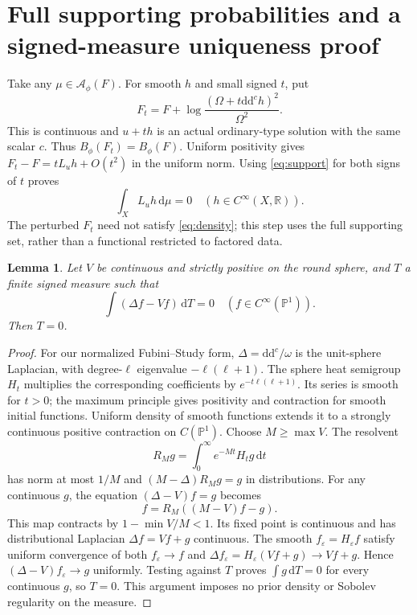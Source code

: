 \documentclass[11pt]{article}
\newtheorem{lemma}[theorem]{Lemma}
\newcommand{\ddc}{\mathrm{d}\mathrm{d}^c}
\newcommand{\suppset}{\mathcal A}
\begin{document}
\section{Full supporting probabilities and a signed-measure uniqueness proof}

Take any $\mu\in\suppset_\phi(F)$. For smooth $h$ and small signed $t$,
put
\[
 F_t=F+\log\frac{(\Omega+t\ddc h)^2}{\Omega^2}.
\]
This is continuous and $u+t h$ is an actual ordinary-type solution with
the same scalar $c$. Thus $B_\phi(F_t)=B_\phi(F)$. Uniform positivity gives
$F_t-F=tL_uh+O(t^2)$ in the uniform norm. Using \eqref{eq:support}
for both signs of $t$ proves
\begin{equation}\label{eq:annihilate}
 \int_XL_uh\,\mathrm{d}\mu=0\quad(h\in C^\infty(X,\mathbb R)).
\end{equation}
The perturbed $F_t$ need not satisfy \eqref{eq:density}; this step uses
the full supporting set, rather than a functional restricted to factored data.

\begin{lemma}\label{lem:resolvent}
Let $V$ be continuous and strictly positive on the round sphere, and $T$
a finite signed measure such that
\[
 \int(\Delta f-Vf)\,\mathrm{d}T=0\quad(f\in C^\infty(\mathbb P^1)).
\]
Then $T=0$.
\end{lemma}
\begin{proof}
For our normalized Fubini--Study form, $\Delta=\ddc/\omega$ is the
unit-sphere Laplacian, with degree-$\ell$ eigenvalue $-\ell(\ell+1)$.
The sphere heat semigroup $H_t$ multiplies the corresponding coefficients
by $e^{-t\ell(\ell+1)}$. Its series is smooth for $t>0$; the maximum
principle gives positivity and contraction for smooth initial functions.
Uniform density of smooth functions extends it to a strongly continuous
positive contraction on $C(\mathbb P^1)$.
Choose $M\ge\max V$. The resolvent
\[
 R_Mg=\int_0^\infty e^{-Mt}H_tg\,\mathrm{d}t
\]
has norm at most $1/M$ and $(M-\Delta)R_Mg=g$ in distributions.
For any continuous $g$, the equation $(\Delta-V)f=g$ becomes
\[
 f=R_M((M-V)f-g).
\]
This map contracts by $1-\min V/M<1$. Its fixed point is continuous
and has distributional Laplacian $\Delta f=Vf+g$ continuous.
The smooth $f_\varepsilon=H_\varepsilon f$ satisfy uniform convergence
of both $f_\varepsilon\to f$ and
$\Delta f_\varepsilon=H_\varepsilon(Vf+g)\to Vf+g$.
Hence $(\Delta-V)f_\varepsilon\to g$ uniformly. Testing against $T$
proves $\int g\,\mathrm{d}T=0$ for every continuous $g$, so $T=0$.
This argument imposes no prior density or Sobolev regularity on the measure.
\end{proof}
\end{document}
